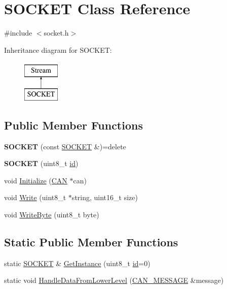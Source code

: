 \hypertarget{class_s_o_c_k_e_t}{}\section{S\+O\+C\+K\+ET Class Reference}
\label{class_s_o_c_k_e_t}


{\ttfamily \#include $<$socket.\+h$>$}

Inheritance diagram for S\+O\+C\+K\+ET\+:\begin{figure}[H]
\begin{center}
\leavevmode
\includegraphics[height=2.000000cm]{class_s_o_c_k_e_t}
\end{center}
\end{figure}
\subsection*{Public Member Functions}
\begin{DoxyCompactItemize}
\item 
{\bfseries S\+O\+C\+K\+ET} (const \hyperlink{class_s_o_c_k_e_t}{S\+O\+C\+K\+ET} \&)=delete\hypertarget{class_s_o_c_k_e_t_a354625580716401ca8444fd01b99e89e}{}\label{class_s_o_c_k_e_t_a354625580716401ca8444fd01b99e89e}

\item 
{\bfseries S\+O\+C\+K\+ET} (uint8\+\_\+t \hyperlink{class_s_o_c_k_e_t_a0755fe74751c2d94d3d1679cad9e6544}{id})\hypertarget{class_s_o_c_k_e_t_ab87e109918e43ba097c153114f4f6494}{}\label{class_s_o_c_k_e_t_ab87e109918e43ba097c153114f4f6494}

\item 
void \hyperlink{class_s_o_c_k_e_t_a69219c6c89e78afcd46df2e0af34a341}{Initialize} (\hyperlink{class_c_a_n}{C\+AN} $\ast$can)
\item 
void \hyperlink{class_s_o_c_k_e_t_ad8ee6b81c9f30267406412a95264abed}{Write} (uint8\+\_\+t $\ast$string, uint16\+\_\+t size)
\item 
void \hyperlink{class_s_o_c_k_e_t_abcddb460b7adf3595a813f08f3659356}{Write\+Byte} (uint8\+\_\+t byte)
\end{DoxyCompactItemize}
\subsection*{Static Public Member Functions}
\begin{DoxyCompactItemize}
\item 
static \hyperlink{class_s_o_c_k_e_t}{S\+O\+C\+K\+ET} \& \hyperlink{class_s_o_c_k_e_t_acd81e49443c51d84f7bfe5d616d1b750}{Get\+Instance} (uint8\+\_\+t \hyperlink{class_s_o_c_k_e_t_a0755fe74751c2d94d3d1679cad9e6544}{id}=0)
\item 
static void \hyperlink{class_s_o_c_k_e_t_ab1345aded87c899fd525616b6f2cca4a}{Handle\+Data\+From\+Lower\+Level} (\hyperlink{struct_c_a_n___m_e_s_s_a_g_e}{C\+A\+N\+\_\+\+M\+E\+S\+S\+A\+GE} \&message)
\end{DoxyCompactItemize}
